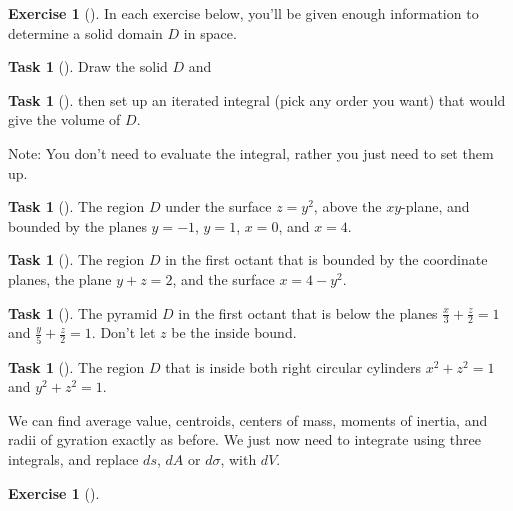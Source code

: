 \documentclass[10pt,]{book}
\theoremstyle{plain}
\theoremstyle{definition}
\theoremstyle{definition}
\theoremstyle{definition}
\theoremstyle{definition}
\newtheorem{exploration}[project]{Exercise}
\newtheorem{task}[project]{Task}
\theoremstyle{definition}
\numberwithin{equation}{section}
\newcommand{\ds}{\displaystyle}
\begin{document}
\begin{exploration}[]\label{exploration-299}
In each exercise below, you'll be given enough information to determine a solid domain \(D\) in space.%
\begin{task}[]\label{task-814}
Draw the solid \(D\) and%
\end{task}
\begin{task}[]\label{task-815}
then set up an iterated integral (pick any order you want) that would give the volume of \(D\).%
\end{task}
Note: You don't need to evaluate the integral, rather you just need to set them up.%
\begin{task}[]\label{task-816}
The region \(D\) under the surface \(z=y^2\), above the \(xy\)-plane, and bounded by the planes \(y=-1\), \(y=1\), \(x=0\), and \(x=4\).%
\end{task}
\begin{task}[]\label{task-817}
The region \(D\) in the first octant that is bounded by the coordinate planes, the plane \(y+z=2\), and the surface \(x=4-y^2\).%
\end{task}
\begin{task}[]\label{task-818}
The pyramid \(D\) in the first octant that is below the planes \(\ds\frac{x}{3}+\frac{z}{2}=1\) and \(\ds\frac{y}{5}+\frac{z}{2}=1\). Don't let \(z\) be the inside bound.%
%
\end{task}
\begin{task}[]\label{task-819}
The region \(D\) that is inside both right circular cylinders \(x^2+z^2=1\) and \(y^2+z^2=1\).%
\end{task}
\end{exploration}
We can find average value, centroids, centers of mass, moments of inertia, and radii of gyration exactly as before. We just now need to integrate using three integrals, and replace \(ds\), \(dA\) or \(d\sigma\), with \(dV\).%
\begin{exploration}[]\label{exploration-300}
\end{exploration}
\end{document}
